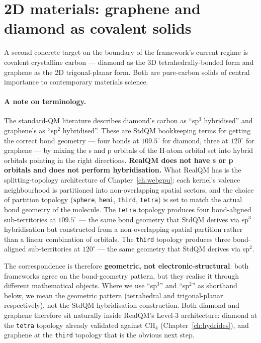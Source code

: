 \section{2D materials: graphene and diamond as covalent solids}\label{sec:graphene}

A second concrete target on the boundary of the framework's current regime is covalent crystalline carbon --- diamond as the 3D tetrahedrally-bonded form and graphene as the 2D trigonal-planar form. Both are pure-carbon solids of central importance to contemporary materials science.

\paragraph{A note on terminology.}
The standard-QM literature describes diamond's carbon as ``sp$^3$ hybridised'' and graphene's as ``sp$^2$ hybridised''. These are StdQM bookkeeping terms for getting the correct bond geometry --- four bonds at $109.5^\circ$ for diamond, three at $120^\circ$ for graphene --- by mixing the s and p orbitals of the H-atom orbital set into hybrid orbitals pointing in the right directions. \textbf{RealQM does not have s or p orbitals and does not perform hybridisation.} What RealQM has is the splitting-topology architecture of Chapter~\ref{ch:webgpu}: each kernel's valence neighbourhood is partitioned into non-overlapping spatial sectors, and the choice of partition topology (\texttt{sphere}, \texttt{hemi}, \texttt{third}, \texttt{tetra}) is set to match the actual bond geometry of the molecule. The \texttt{tetra} topology produces four bond-aligned sub-territories at $109.5^\circ$ --- the same bond geometry that StdQM derives via sp$^3$ hybridisation but constructed from a non-overlapping spatial partition rather than a linear combination of orbitals. The \texttt{third} topology produces three bond-aligned sub-territories at $120^\circ$ --- the same geometry that StdQM derives via sp$^2$.

The correspondence is therefore \textbf{geometric, not electronic-structural}: both frameworks agree on the bond-geometry pattern, but they realise it through different mathematical objects. Where we use ``sp$^3$'' and ``sp$^2$'' as shorthand below, we mean the geometric pattern (tetrahedral and trigonal-planar respectively), not the StdQM hybridisation construction. Both diamond and graphene therefore sit naturally inside RealQM's Level-3 architecture: diamond at the \texttt{tetra} topology already validated against CH$_4$ (Chapter~\ref{ch:hydrides}), and graphene at the \texttt{third} topology that is the obvious next step.

